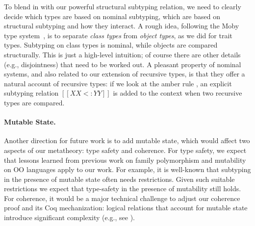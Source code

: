 To blend in with our powerful structural subtyping relation, we need to clearly
decide which types are based on nominal subtyping, which are based on structural
subtyping and how they interact. A rough idea, following the \textsf{Moby} type
system~\citep{fisher2000extending}, is to separate \textit{class types} from
\textit{object types}, as we did for trait types. Subtyping on class types is
nominal, while objects are compared structurally. This is just a high-level
intuition; of course there are other details (e.g., disjointness) that need to
be worked out. A pleasant property of nominal systems, and also related to our
extension of recursive types, is that they offer a natural account of recursive
types: if we look at the amber rule , an explicit subtyping
relation $[[XX <: YY]]$ is added to the context when two recursive types are
compared.



\paragraph{Mutable State.}

Another direction for future work is to add mutable state, which would affect
two aspects of our metatheory: type safety and coherence. For type safety, we
expect that lessons learned from previous work on family polymorphism and
mutability on OO languages apply to our work. For example, it is well-known that
subtyping in the presence of mutable state often needs restrictions. Given such
suitable restrictions we expect that type-safety in the presence of mutability
still holds. For coherence, it would be a major technical challenge to adjust
our coherence proof and its Coq mechanization: logical relations that account
for mutable state introduce significant complexity (e.g., see
\citet{ahmed2004semantics}).





